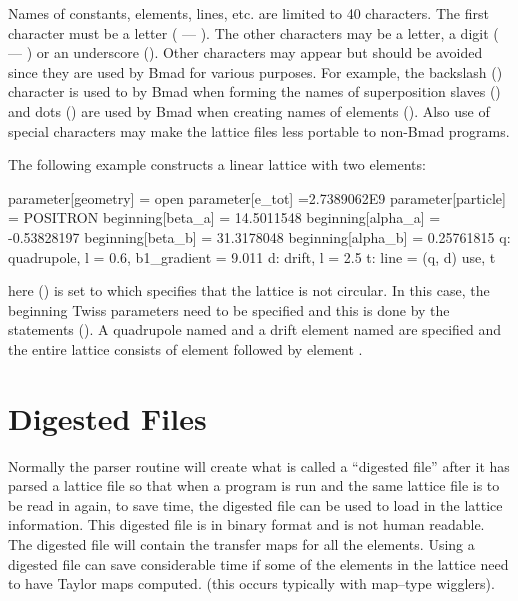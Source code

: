 Names of constants, elements, lines, etc. are limited to 40 characters. The first character must be
a letter ( --- ).  The other characters may be a letter, a digit ( --- ) or
an underscore (\vn{_}). Other characters may appear but should be avoided since they are used by
Bmad for various purposes. For example, the backslash (\vn{\B}) character is used to by Bmad when
forming the names of superposition slaves () and dots () are used by Bmad when
creating names of  elements (). Also use of special characters may make the
lattice files less portable to non-Bmad programs.

The following example constructs a linear lattice with two elements: 
\begin{example}
  parameter[geometry] = open
  parameter[e_tot] =2.7389062E9
  parameter[particle] = POSITRON
  beginning[beta_a] = 14.5011548
  beginning[alpha_a] = -0.53828197
  beginning[beta_b] = 31.3178048
  beginning[alpha_b] = 0.25761815
  q: quadrupole, l = 0.6, b1_gradient = 9.011
  d: drift, l = 2.5
  t: line = (q, d)
  use, t 
\end{example}
here  () is set to  which specifies that the lattice
is not circular. In this case, the beginning Twiss parameters need to be specified and this is done
by the  statements (). A quadrupole named  and a drift element
named  are specified and the entire lattice consists of element  followed by element
.

\section{Digested Files}
\label{s:digested}

Normally the \bmad parser routine will create what is called a ``digested file'' after it has parsed
a lattice file so that when a program is run and the same lattice file is to be read in again, to
save time, the digested file can be used to load in the lattice information.  This digested file is
in binary format and is not human readable. The digested file will contain the transfer maps for all
the elements.  Using a digested file can save considerable time if some of the elements in the
lattice need to have Taylor maps computed.  (this occurs typically with map--type wigglers).

